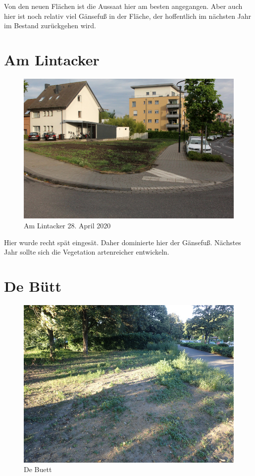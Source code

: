 \documentclass[10pt]{article}
\begin{document}
Von den neuen Flächen ist die Aussaat hier am besten angegangen. Aber auch hier ist noch relativ viel Gänsefuß in der Fläche, der hoffentlich im nächsten Jahr im Bestand zurückgehen wird.

\clearpage
\section{Am Lintacker}
\begin{figure}[h!]
  \includegraphics[width=\linewidth]{img/lintacker/april.jpg}
  \caption{Am Lintacker 28. April 2020}
\end{figure}

Hier wurde recht spät eingesät. Daher dominierte hier der Gänsefuß.
Nächstes Jahr sollte sich die Vegetation artenreicher entwickeln.

\clearpage
\section{De Bütt}
\begin{figure}[h!]
  \includegraphics[width=\linewidth]{img/buett/juli.jpg}
  \caption{De Buett}
\end{figure}
\end{document}
